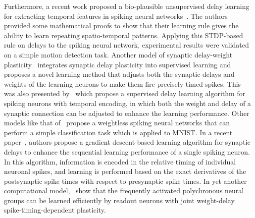 \documentclass[brainsci, %
               review,submit,pdftex,moreauthors
               ]{Definitions/mdpi}
\begin{document}
Furthermore, a recent work proposed a bio-plausible unsupervised delay learning for extracting temporal features in spiking neural networks~\citep{nadafian_bio-plausible_2020}. The authors provided some mathematical proofs to show that their learning rule gives the ability to learn repeating spatio-temporal patterns. Applying this STDP-based rule on delays to the spiking neural network, experimental results were validated on a simple motion detection task. Another model of synaptic delay-weight plasticity~\citep{zhang_supervised_2020} integrates synaptic delay plasticity into supervised learning and proposes a novel learning method that adjusts both the synaptic delays and weights of the learning neurons to make them fire precisely timed spikes. This was also presented by~\citep{wang_delay_2019} which propose a supervised delay learning algorithm for spiking neurons with temporal encoding, in which both the weight and delay of a synaptic connection can be adjusted to enhance the learning performance. Other models like that of~\citep{hazan_memory_2022} propose a weightless spiking neural networks that can perform a simple classification task which is applied to MNIST. In a recent paper~\citep{luo_supervised_2022}, authors propose a gradient descent-based learning algorithm for synaptic delays to enhance the sequential learning performance of a single spiking neuron. In this algorithm, information is encoded in the relative timing of individual neuronal spikes, and learning is performed based on the exact derivatives of the postsynaptic spike times with respect to presynaptic spike times.
In yet another computational model,~\citet{sun_learning_2016} show that the frequently activated polychronous neural groups can be learned efficiently by readout neurons with joint weight-delay spike-timing-dependent plasticity.

\end{document}
